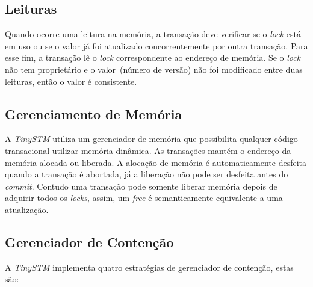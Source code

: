 \documentclass[diss,capa]{texufpel}
\begin{document}
\subsection{Leituras}

Quando ocorre uma leitura na memória, a transação deve verificar se o \emph{lock} está em uso ou se  o valor já foi atualizado concorrentemente por outra transação. Para esse fim, a transação lê o \emph{lock} correspondente ao endereço de memória. Se o \emph{lock} não tem proprietário e o valor~(número de versão) não foi modificado entre duas leituras, então o valor é consistente.

\subsection{Gerenciamento de Memória}

A \emph{TinySTM} utiliza um gerenciador de memória que possibilita qualquer código transacional utilizar memória dinâmica. As transações mantém o endereço da memória alocada ou liberada. A alocação de memória é automaticamente desfeita quando a transação é abortada, já a liberação não pode ser desfeita antes do \emph{commit}. Contudo uma transação pode somente liberar memória depois de adquirir todos os \emph{locks}, assim, um \emph{free} é semanticamente equivalente a uma atualização.

\subsection{Gerenciador de Contenção}

A \emph{TinySTM} implementa quatro estratégias de gerenciador de contenção, estas são:
\end{document}
